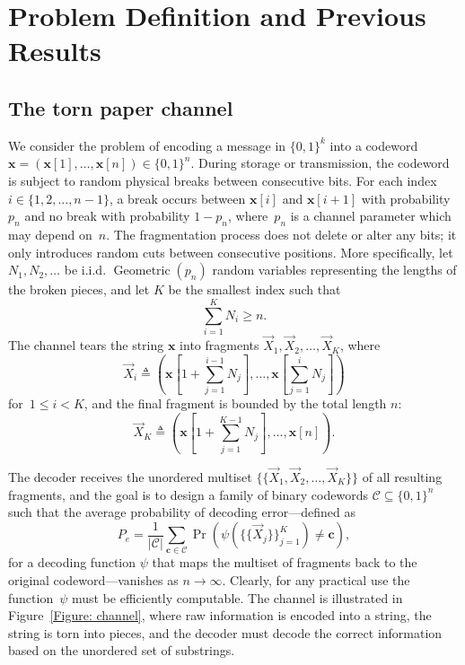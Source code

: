 \documentclass[journal,letterpaper,onecolumn,11pt]{IEEEtran}
\newcommand{\boldc}{\mathbf{c}}
\newcommand{\boldx}{\mathbf{x}}
\begin{document}
\section{Problem Definition and Previous Results}\label{Section:problem definition}

\subsection{The torn paper channel}\label{section:torn-paper-channel}
We consider the problem of encoding 
a message in $\{0,1\}^k$ into a codeword~$\boldx=(\boldx[1],\ldots,\boldx[n])\in\{0,1\}^n$. 
During storage or transmission, the codeword is subject to random physical breaks between consecutive bits. 
For each index $i\in \{1,2,\dots,n-1\}$, a break occurs between $\boldx[i]$ and $\boldx[i+1]$ with probability $p_n$ and no break with probability $1-p_n$, where~$p_n$ is a channel parameter which may depend on~$n$.
The fragmentation process does not delete or alter any bits; it only introduces random cuts between consecutive positions. 
More specifically, let $N_1, N_2, \ldots$ be i.i.d. $\operatorname{Geometric}(p_n)$ random variables representing the lengths of the broken pieces, and let $K$ be the smallest index such that $$\sum_{i=1}^{K} N_i \ge n.$$
The channel tears the string $\boldx$ into fragments $\vec{X}_1, \vec{X}_2, \ldots, \vec{X}_K$, where 
$$\vec{X}_i \triangleq \left( \boldx[1+\textstyle\sum_{j=1}^{i-1} N_j], \dots, \boldx[\textstyle\sum_{j=1}^i N_j] \right)$$
for~$1\le i<K$, and the final fragment is bounded by the total length $n$:
$$\vec{X}_K \triangleq \left( \boldx[1+\textstyle\sum_{j=1}^{K-1} N_j], \dots, \boldx[n] \right).$$

The decoder receives the unordered multiset $\{\{\vec{X}_1, \vec{X}_2, \dots, \vec{X}_K\}\}$ of all resulting fragments, and the goal is to design a family of binary codewords $\mathcal{C} \subseteq \{0,1\}^n$ such that the average probability of decoding error—defined as
\[
P_e
=
\frac{1}{|\mathcal{C}|}
\sum_{\boldc\in\mathcal{C}}
\Pr\!\left(
\psi\!\left(\{\{\vec{X}_j\}\}_{j=1}^K\right)\neq \boldc
\right),
\]
for a decoding function \(\psi\) that maps the multiset of fragments back to the original codeword—vanishes as \(n\to\infty\).
Clearly, for any practical use the function~$\psi$ must be efficiently computable. 
The channel is illustrated in Figure~\ref{Figure: channel}, where raw information is encoded into a string, the string is torn into pieces, and the decoder must decode the correct information based on the unordered set of substrings.
\end{document}
